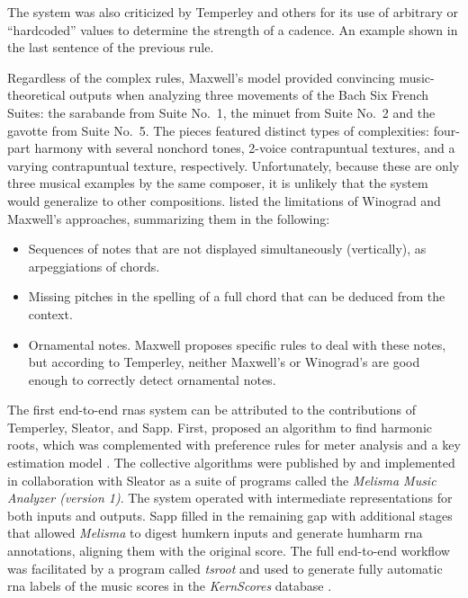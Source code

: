 The system was also criticized by Temperley and others for
its use of arbitrary or ``hardcoded'' values to determine
the strength of a cadence. An example shown in the last
sentence of the previous rule.

Regardless of the complex rules, Maxwell's model provided
convincing music-theoretical outputs when analyzing three
movements of the Bach Six French Suites: the sarabande from
Suite No.~1, the minuet from Suite No.~2 and the gavotte
from Suite No.~5. The pieces featured distinct types of
complexities: four-part harmony with several nonchord tones,
2-voice contrapuntual textures, and a varying contrapuntual
texture, respectively. Unfortunately, because these are only
three musical examples by the same composer, it is unlikely
that the system would generalize to other compositions.
\textcite{temperley1997algorithm} listed the limitations of
Winograd and Maxwell's approaches, summarizing them in the
following:

\begin{itemize}
    \item Sequences of notes that are not displayed
    simultaneously (vertically), as arpeggiations of chords.
    \item Missing pitches in the spelling of a full chord
    that can be deduced from the context.
    \item Ornamental notes. Maxwell proposes specific rules
    to deal with these notes, but according to Temperley,
    neither Maxwell's or Winograd's are good enough to
    correctly detect ornamental notes.
\end{itemize}


The first end-to-end \glspl{rna} system can be attributed to
the contributions of Temperley, Sleator, and Sapp. First,
\textcite{temperley1997algorithm} proposed an algorithm to
find harmonic roots, which was complemented with preference
rules for meter analysis \parencite{temperley1999modeling}
and a key estimation model \parencite{temperley1999whats}.
The collective algorithms were published by
\textcite{temperley2004cognition} and implemented in
collaboration with Sleator as a suite of programs called the
\emph{Melisma Music Analyzer (version
1)}.
The system operated with intermediate representations for
both inputs and outputs. Sapp filled in the remaining gap
with additional stages that allowed \emph{Melisma} to digest
\gls{humkern} inputs and generate \gls{humharm} \gls{rna}
annotations, aligning them with the original score. The full
end-to-end workflow was facilitated by a program called
\emph{tsroot} \parencite{sapp2009tsroot} and used to
generate fully automatic \gls{rna} labels of the music
scores in the \emph{KernScores} database
\parencite{sapp2005online}.

